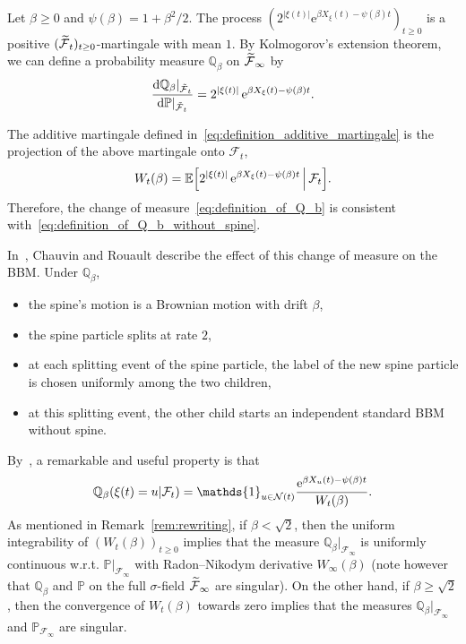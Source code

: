 \documentclass[AHL,Unicode,longabstracts,published]{cedram}
\newcommand{\e}{\mathrm{e}}
\renewcommand{\d}[1]{\mathop{}\!\mathrm{d}#1}
\newcommand{\E}{\mathbb{E}}
\renewcommand{\P}{\mathbb{P}}
\newcommand{\Q}{\mathbb{Q}}
\newcommand\1{\mathds{1}}
\newcommand{\cF}{\mathcal{F}}
\newcommand{\cN}{\mathcal{N}}
\let\oldtilde\tilde
\renewcommand*{\tilde}[1]{\mathchoice{\widetilde{#1}}{\widetilde{#1}}{\oldtilde{#1}}{\oldtilde{#1}}}
\let\originalleft\left
\let\originalright\right
\renewcommand{\left}{\mathopen{}\mathclose\bgroup\originalleft}
\renewcommand{\right}{\aftergroup\egroup\originalright}
\begin{document}
Let $\beta \geq 0$ and $\psi(\beta) = 1 + \beta^2/2$. The process $(2^{|\xi(t)|} \e^{\beta X_\xi(t) - \psi(\beta)t})_{t \geq 0}$ is a positive $(\tilde{\cF}_t)_{t \geq 0}$-martingale with mean $1$. By Kolmogorov's extension theorem, we can define a probability measure $\Q_\beta$ on $\tilde{\cF}_\infty$ by
\begin{equation}\label{eq:definition_of_Q_b}
\frac{\d{\Q_\beta|_{\tilde{\cF}_t}}}{\d{\P|_{\tilde{\cF}_t}}} = 2^{|\xi(t)|}\, \e^{\beta X_\xi(t) - \psi(\beta)t}.
\end{equation}

\begin{rema}
The additive martingale defined in~\eqref{eq:definition_additive_martingale} is the projection of the above martingale onto $\cF_t$,
\begin{equation*}
W_t(\beta) = \E \left[2^{|\xi(t)|}\, \e^{\beta X_\xi(t) - \psi(\beta)t} \,\middle|\, \cF_t \right].
\end{equation*}
Therefore, the change of measure~\eqref{eq:definition_of_Q_b} is consistent with~\eqref{eq:definition_of_Q_b_without_spine}.
\end{rema}

\pagebreak{}
In~\cite[Theorem~5]{ChauvinRouault1988}, Chauvin and Rouault describe the effect of this change of measure on the BBM. Under $\Q_\beta$,
\begin{itemize}
\item the spine's motion is a Brownian motion with drift $\beta$,
\item the spine particle splits at rate $2$,
\item at each splitting event of the spine particle, the label of the new spine particle is chosen uniformly among the two children,
\item at this splitting event, the other child starts an independent standard BBM without spine.
\end{itemize}
By~\cite[Theorem~8.1]{HardyHarris2006}, a remarkable and useful property is that
\begin{equation}\label{eq:gibbs_measure_weights}
\Q_{\beta} \left(\xi(t) = u \middle| \cF_t \right) = \1_{u \in \cN(t)} \frac{\e^{\beta X_u(t) - \psi(\beta)t}}{W_t(\beta)}.
\end{equation}
As mentioned in Remark~\ref{rem:rewriting}, if $\beta < \sqrt{2}$, then the uniform integrability of $(W_t(\beta))_{t\geq 0}$ implies that the measure $\Q_\beta|_{\cF_\infty}$ is uniformly continuous w.r.t. $\P|_{\cF_\infty}$ with Radon--Nikodym derivative $W_\infty(\beta)$ (note however that $\Q_\beta$ and $\P$ on the full $\sigma$-field $\tilde{\cF}_\infty$ are singular). On the other hand, if $\beta \geq \sqrt{2}$, then the convergence of $W_t(\beta)$ towards zero implies that the measures $\Q_\beta|_{\cF_\infty}$ and $\P_{\cF_\infty}$ are singular.
\end{document}
